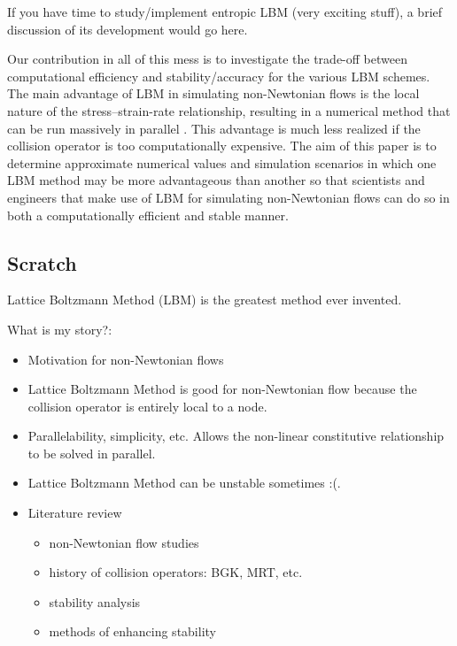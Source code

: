 \documentclass{article}
\begin{document}
{\color{red} If you have time to study/implement entropic LBM (very exciting stuff), a brief discussion of its development would go here.}

Our contribution in all of this mess is to investigate the trade-off between computational efficiency and stability/accuracy for the various LBM schemes.
The main advantage of LBM in simulating non-Newtonian flows is the local nature of the stress--strain-rate relationship, resulting in a numerical method that can be run massively in parallel \cite{something}.
This advantage is much less realized if the collision operator is too computationally expensive.
The aim of this paper is to determine approximate numerical values and simulation scenarios in which one LBM method may be more advantageous than another so that scientists and engineers that make use of LBM for simulating non-Newtonian flows can do so in both a computationally efficient and stable manner. %

{\color{red}
\subsection{Scratch}

Lattice Boltzmann Method (LBM) is the greatest method ever invented.

What is my story?:

\begin{itemize}
	\item Motivation for non-Newtonian flows
	\item Lattice Boltzmann Method is good for non-Newtonian flow because the collision operator is entirely local to a node.
	\item Parallelability, simplicity, etc. Allows the non-linear constitutive relationship to be solved in parallel.
	\item Lattice Boltzmann Method can be unstable sometimes :(.
	\item Literature review
	\begin{itemize}
		\item non-Newtonian flow studies
		\item history of collision operators: BGK, MRT, etc.
		\item stability analysis
		\item methods of enhancing stability
	\end{itemize}
\end{itemize}
}
\end{document}
